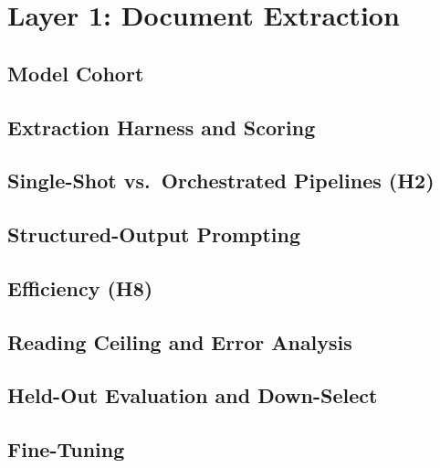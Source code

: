 \chapter{Layer 1: Document Extraction}
\label{ch:extraction}


\section{Model Cohort}
\label{sec:ext-cohort}

\section{Extraction Harness and Scoring}
\label{sec:ext-harness}

\section{Single-Shot vs.\ Orchestrated Pipelines (H2)}
\label{sec:ext-architecture}

\section{Structured-Output Prompting}
\label{sec:ext-structured}

\section{Efficiency (H8)}
\label{sec:ext-efficiency}

\section{Reading Ceiling and Error Analysis}
\label{sec:ext-ceiling}

\section{Held-Out Evaluation and Down-Select}
\label{sec:ext-heldout}

\section{Fine-Tuning}
\label{sec:ext-finetune}
